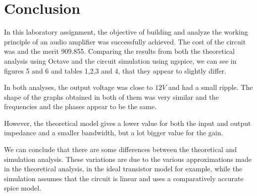\section{Conclusion}
\label{sec:conclusion}
In this laboratory assignment, the objective of building and analyze the working principle of an audio amplifier was successfully achieved.
The cost of the circuit was  and the merit 909.855.
Comparing the results from both the theoretical analysis using Octave and the circuit simulation using ngspice, we can see in figures 5 and 6 and tables 1,2,3 and 4, that they appear to slightly differ.

In both analyses, the output voltage was close to $12 V$ and had a small ripple. The shape of the graphs obtained in both of them was very similar and the frequencies and the phases appear to be the same.

However, the theoretical model gives a lower value for both the input and output impedance and a smaller bandwidth, but a lot bigger value for the gain. 

We can conclude that there are some differences between the theoretical and simulation analysis. These variations are due to the various approximations made in the theoretical analysis, in the ideal transistor model for example, while the simulation assumes that the circuit is linear and uses a comparatively accurate spice model.  



